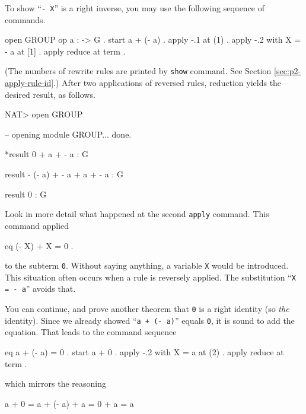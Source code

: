 \documentclass[a4paper]{memoir}
\begin{document}
To show ``\verb|- X|'' is a right inverse, you may use the
following sequence of commands.
\begin{vvtm}
\begin{ccode}
  open GROUP
  op a : -> G .
  start a + (- a) .
  apply -.1 at (1) .
  apply -.2 with X = - a at [1] .
  apply reduce at term .
\end{ccode}
\end{vvtm}
(The numbers of rewrite rules are printed by \verb|show| command. See
Section \ref{sec:p2-apply-rule-id}.)
After two applications of reversed rules, reduction yields the desired
result, as follows.
\begin{vvtm}
\begin{ccode}
  NAT> open GROUP

  -- opening module GROUP... done.



  *result 0 + a + - a : G

  result - (- a) + - a + a + - a : G

  result 0 : G

\end{ccode}
\end{vvtm}
Look in more detail what happened at the second \verb|apply|
command. This command applied
\begin{vvtm}
\begin{ccode}
  eq (- X) + X = 0 .
\end{ccode}
\end{vvtm}
to the subterm \verb|0|. Without saying anything, a variable \verb|X|
would be introduced. This situation often occurs when a rule is
reversely applied. The substitution ``\verb|X = - a|'' avoids that.

You can continue, and prove another theorem that \verb|0| is a right identity
(so {\em the} identity).
Since we already showed ``\verb|a + (- a)|'' equals \verb|0|, it is
sound to add the equation. That leads to the command sequence
\begin{vvtm}
\begin{ccode}
  eq a + (- a) = 0 .
  start a + 0 .
  apply -.2 with X = a at (2) .
  apply reduce at term .
\end{ccode}
\end{vvtm}
which mirrors the reasoning
\begin{vvtm}
\begin{ccode}
  a + 0 = a + (- a) + a = 0 + a = a
\end{ccode}
\end{vvtm}
\end{document}
